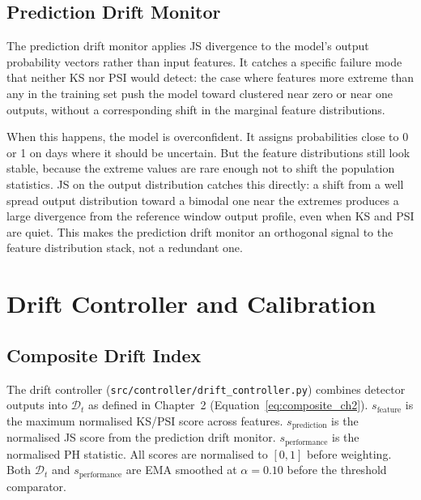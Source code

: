 \subsection{Prediction Drift Monitor}
\label{subsec:pred_drift}

The prediction drift monitor applies JS divergence to the model's output probability vectors rather than input features. It catches a specific failure mode that neither KS nor PSI would detect: the case where features more extreme than any in the training set push the model toward clustered near zero or near one outputs, without a corresponding shift in the marginal feature distributions.

When this happens, the model is overconfident. It assigns probabilities close to 0 or 1 on days where it should be uncertain. But the feature distributions still look stable, because the extreme values are rare enough not to shift the population statistics. JS on the output distribution catches this directly: a shift from a well spread output distribution toward a bimodal one near the extremes produces a large divergence from the reference window output profile, even when KS and PSI are quiet. This makes the prediction drift monitor an orthogonal signal to the feature distribution stack, not a redundant one.

\section{Drift Controller and Calibration}
\label{sec:controller}

\subsection{Composite Drift Index}
\label{subsec:composite}

The drift controller (\texttt{src/controller/drift\_controller.py}) combines detector outputs into $\mathcal{D}_t$ as defined in Chapter~2 (Equation~\ref{eq:composite_ch2}). $s_{\text{feature}}$ is the maximum normalised KS/PSI score across features. $s_{\text{prediction}}$ is the normalised JS score from the prediction drift monitor. $s_{\text{performance}}$ is the normalised PH statistic. All scores are normalised to $[0,1]$ before weighting. Both $\mathcal{D}_t$ and $s_{\text{performance}}$ are EMA smoothed at $\alpha{=}0.10$ before the threshold comparator.


